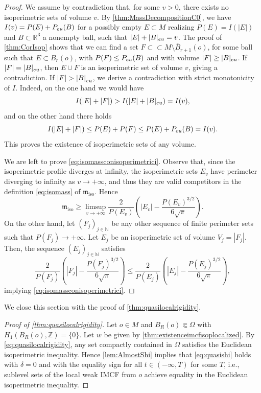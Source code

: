 \documentclass[a4paper,12pt,reqno]{amsart}
\numberwithin{equation}{section}
\theoremstyle{plain}
\theoremstyle{definition}
\theoremstyle{remark}
\newcommand{\N}{\mathbb{N}}
\newcommand{\abs}[1]{\left\lvert#1\right\rvert}
\begin{document}
{\begin{proof}
We assume by contradiction that, for some $v > 0$, there exists no isoperimetric sets of volume $v$. By \cref{thm:MassDecompositionC0}, we have $I(v) = P(E) + P_{\rm eu} (B)$ for a possibly empty $E \subset M$ realizing $P(E) = I(|E|)$ and $B \subset \mathbb{R}^3$ a nonempty ball, such that $|E| + |B|_{\rm eu} = v$.  
The proof of \cref{thm:CorIsop} shows that we can find a set $F \subset\subset M\setminus \overline{B}_{r+1}(o)$, for some ball such that $E\subset B_r(o)$, with $P(F) \leq P_{\rm eu} (B)$ and with volume $|F| \geq |B|_{\rm eu}$. If $|F| = |B|_{\rm eu}$, then $E \cup F$ is an isoperimetric set of volume $v$, giving a contradiction. If $\abs{F} > \abs{B}_{\rm eu}$, we derive a contradiction with strict monotonicity of $I$. Indeed, on the one hand we would have
\[
I(\abs{E} + \abs{F}) > I(\abs{E} + |B|_{\rm eu}) = I(v),
\]
and on the other hand there holds
\[
I(\abs{E} + \abs{F}) \leq P(E) + P(F) \leq P(E) + P_{\rm eu}(B) = I(v).
\]
This proves the existence of isoperimetric sets of any volume.

We are left to prove \eqref{eq:isomassconisoperimetrici}. 
Observe that, since the isoperimetric profile diverges at infinity, the isoperimetric sets $E_v$ have perimeter diverging to infinity as $v \to +\infty$, and thus they are valid competitors in the definition \eqref{eq:isomass} of $\mathfrak{m}_{\mathrm{iso}}$. Hence
\[
{\mathfrak{m}}_{\mathrm{iso}}  \geq \limsup_{v \to +\infty} \frac{2}{P(E_v)}\left(|E_v|-\frac{P(E_v)^{3/2}}{6\sqrt{\pi}}\right).
\]
On the other hand, let $(F_j)_{j \in \N}$ be any other sequence of finite perimeter sets such that $P(F_j) \to +\infty$. Let $E_j$ be an isoperimetric set of volume $V_j = \abs{F_j}$. Then, the sequence $(E_{j})_{j \in \N}$ satisfies
\[
\frac{2}{P(F_j)}\left(|F_j|-\frac{P(F_j)^{3/2}}{6\sqrt{\pi}}\right) \leq \frac{2}{P(E_{j})}\left(|E_{j}|-\frac{P(E_j)^{3/2}}{6\sqrt{\pi}}\right),
\]
implying \eqref{eq:isomassconisoperimetrici}.
\end{proof}
We close this section with the proof of \cref{thm:quasilocalrigidity}. 


\begin{proof}[Proof of \cref{thm:quasilocalrigidity}]
Let $o \in M$ and $B_R(o) \Subset \Omega$ with $H_1(B_R(o), \mathbb{Z}) = \{0\}$. Let $w$ be given by \cref{thm:existenceimcfisoplocalized}. By \eqref{eq:quasilocalrigidity}, any set compactly contained in $\Omega$ satisfies the Euclidean isoperimetric inequality. Hence \cref{lem:AlmostShi} implies that \eqref{eq:quasishi} holds with $\delta = 0$ and with the equality sign for all $t \in (-\infty, T)$ for some $T$, i.e., sublevel sets of the local weak IMCF from $o$ achieve equality in the Euclidean isoperimetric inequality.


\end{proof}}
\end{document}
